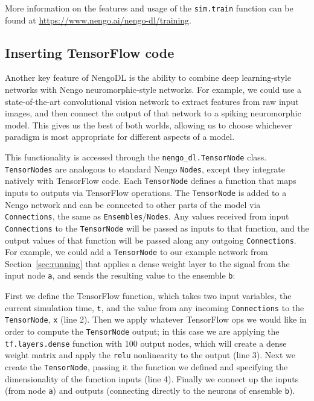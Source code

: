 \documentclass{article}
\begin{document}
More information on the features and usage of the \texttt{sim.train} function can be found at \url{https://www.nengo.ai/nengo-dl/training}.

\subsection{Inserting TensorFlow code}
\label{sec:tensornode}

Another key feature of NengoDL is the ability to combine deep learning-style networks with Nengo neuromorphic-style networks.  For example, we could use a state-of-the-art convolutional vision network to extract features from raw input images, and then connect the output of that network to a spiking neuromorphic model.  This gives us the best of both worlds, allowing us to choose whichever paradigm is most appropriate for different aspects of a model.

This functionality is accessed through the \texttt{nengo\_dl.TensorNode} class.  \texttt{TensorNodes} are analogous to standard Nengo \texttt{Nodes}, except they integrate natively with TensorFlow code.  Each \texttt{TensorNode} defines a function that maps inputs to outputs via TensorFlow operations.  The \texttt{TensorNode} is added to a Nengo network and can be connected to other parts of the model via \texttt{Connections}, the same as \texttt{Ensembles}/\texttt{Nodes}.  Any values received from input \texttt{Connections} to the \texttt{TensorNode} will be passed as inputs to that function, and the output values of that function will be passed along any outgoing \texttt{Connections}.  For example, we could add a \texttt{TensorNode} to our example network from Section~\ref{sec:running} that applies a dense weight layer to the signal from the input node \texttt{a}, and sends the resulting value to the ensemble \texttt{b}:



First we define the TensorFlow function, which takes two input variables, the current simulation time, \texttt{t}, and the value from any incoming \texttt{Connections} to the \texttt{TensorNode}, \texttt{x} (line 2).  Then we apply whatever TensorFlow ops we would like in order to compute the \texttt{TensorNode} output; in this case we are applying the \texttt{tf.layers.dense} function with 100 output nodes, which will create a dense weight matrix and apply the \texttt{relu} nonlinearity to the output (line 3).  Next we create the \texttt{TensorNode}, passing it the function we defined and specifying the dimensionality of the function inputs (line 4).  Finally we connect up the inputs (from node \texttt{a}) and outputs (connecting directly to the neurons of ensemble \texttt{b}).
\end{document}
